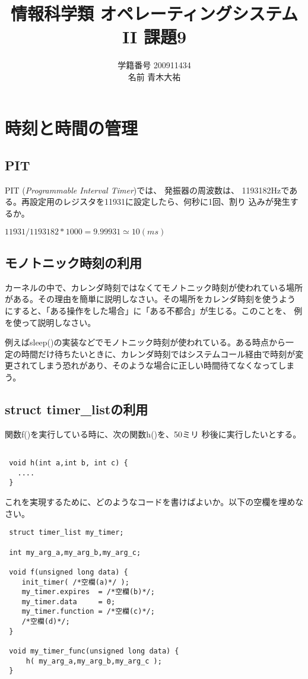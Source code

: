 \documentclass[a4j,9pt]{jsarticle}
\title{情報科学類 オペレーティングシステムII 課題9}
\author{学籍番号 200911434 \\ 名前 青木大祐}
\begin{document}
\maketitle
\setcounter{section}{8}
\section{時刻と時間の管理}
\setcounter{subsection}{900}
\subsection{PIT}
\begin{screen}
PIT ({\itshape Programmable Interval Timer})では、 発振器の周波数は、
1193182Hzである。再設定用のレジスタを11931に設定したら、何秒に1回、割り
込みが発生するか。
\end{screen}
$11931/1193182*1000 = 9.99931 \simeq 10(ms)$

\subsection{モノトニック時刻の利用}
\begin{screen}
カーネルの中で、カレンダ時刻ではなくてモノトニック時刻が使われている場所
 がある。その理由を簡単に説明しなさい。その場所をカレンダ時刻を使うよう
 にすると、「ある操作をした場合」に「ある不都合」が生じる。このことを、
 例を使って説明しなさい。
\end{screen}

例えばsleep()の実装などでモノトニック時刻が使われている。ある時点から一
定の時間だけ待ちたいときに、カレンダ時刻ではシステムコール経由で時刻が変
更されてしまう恐れがあり、そのような場合に正しい時間待てなくなってしまう。

\subsection{struct timer\_listの利用}
\begin{screen}
関数{\ttfamily f()}を実行している時に、次の関数{\ttfamily h()}を、50ミリ
 秒後に実行したいとする。

\begin{lstlisting}
 
 void h(int a,int b, int c) {
   ....
 }
\end{lstlisting}
これを実現するために、どのようなコードを書けばよいか。以下の空欄を埋めなさい。
\begin{lstlisting}
 struct timer_list my_timer;

 int my_arg_a,my_arg_b,my_arg_c;

 void f(unsigned long data) {
    init_timer( /*空欄(a)*/ );
    my_timer.expires  = /*空欄(b)*/;
    my_timer.data     = 0;
    my_timer.function = /*空欄(c)*/;
    /*空欄(d)*/;
 }

 void my_timer_func(unsigned long data) {
     h( my_arg_a,my_arg_b,my_arg_c );
 }
\end{lstlisting}
\end{screen}
\end{document}
